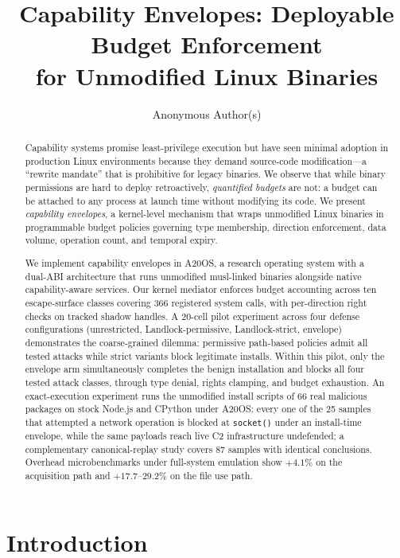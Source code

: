 \documentclass[letterpaper,twocolumn,10pt]{article}
\title{Capability Envelopes: Deployable Budget Enforcement\\for Unmodified Linux Binaries}
\author{Anonymous Author(s)}
\date{}
\begin{document}
\maketitle

\begin{abstract}
Capability systems promise least-privilege execution but have seen
minimal adoption in production Linux environments because they demand
source-code modification---a ``rewrite mandate'' that is prohibitive for
legacy binaries.  We observe that while binary permissions are hard to
deploy retroactively, \emph{quantified budgets} are not: a budget can be
attached to any process at launch time without modifying its code.  We
present \emph{capability envelopes}, a kernel-level mechanism that wraps
unmodified Linux binaries in programmable budget policies governing type
membership, direction enforcement, data volume, operation count, and
temporal expiry.

We implement capability envelopes in A20OS, a research operating system
with a dual-ABI architecture that runs unmodified musl-linked binaries
alongside native capability-aware services.  Our kernel mediator enforces
budget accounting across ten escape-surface classes covering 366 registered
system calls, with per-direction right checks on tracked shadow handles.
A 20-cell pilot experiment across four defense configurations
(unrestricted, Landlock-permissive, Landlock-strict, envelope)
demonstrates the coarse-grained dilemma: permissive path-based policies
admit all tested attacks while strict variants block legitimate installs.
Within this pilot, only the envelope arm simultaneously completes the
benign installation and blocks all four tested attack classes, through
type denial, rights clamping, and budget exhaustion.  An
exact-execution experiment runs the unmodified install scripts of 66
real malicious packages on stock Node.js and CPython under A20OS:
every one of the 25 samples that attempted a network operation is
blocked at \texttt{socket()} under an install-time envelope, while the
same payloads reach live C2 infrastructure undefended; a complementary
canonical-replay study covers 87 samples with identical conclusions.
Overhead microbenchmarks under full-system emulation show $+4.1\%$ on
the acquisition path and $+17.7$--$29.2\%$ on the file use path.
\end{abstract}

\section{Introduction}
\end{document}
